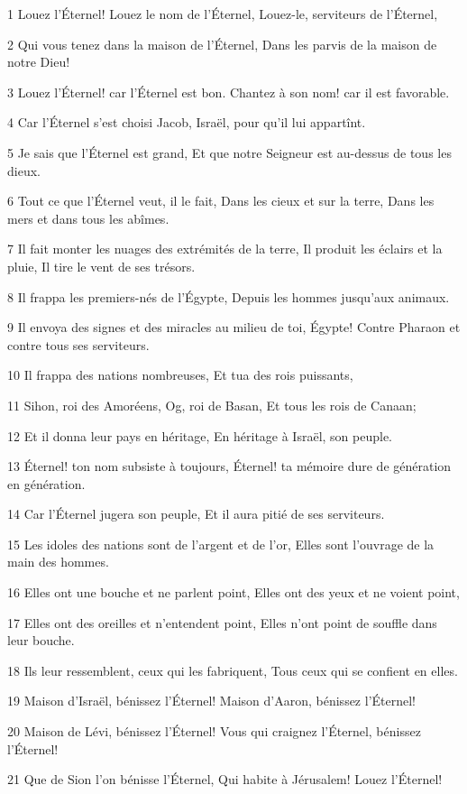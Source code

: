 \par 1 Louez l'Éternel! Louez le nom de l'Éternel, Louez-le, serviteurs de l'Éternel,
\par 2 Qui vous tenez dans la maison de l'Éternel, Dans les parvis de la maison de notre Dieu!
\par 3 Louez l'Éternel! car l'Éternel est bon. Chantez à son nom! car il est favorable.
\par 4 Car l'Éternel s'est choisi Jacob, Israël, pour qu'il lui appartînt.
\par 5 Je sais que l'Éternel est grand, Et que notre Seigneur est au-dessus de tous les dieux.
\par 6 Tout ce que l'Éternel veut, il le fait, Dans les cieux et sur la terre, Dans les mers et dans tous les abîmes.
\par 7 Il fait monter les nuages des extrémités de la terre, Il produit les éclairs et la pluie, Il tire le vent de ses trésors.
\par 8 Il frappa les premiers-nés de l'Égypte, Depuis les hommes jusqu'aux animaux.
\par 9 Il envoya des signes et des miracles au milieu de toi, Égypte! Contre Pharaon et contre tous ses serviteurs.
\par 10 Il frappa des nations nombreuses, Et tua des rois puissants,
\par 11 Sihon, roi des Amoréens, Og, roi de Basan, Et tous les rois de Canaan;
\par 12 Et il donna leur pays en héritage, En héritage à Israël, son peuple.
\par 13 Éternel! ton nom subsiste à toujours, Éternel! ta mémoire dure de génération en génération.
\par 14 Car l'Éternel jugera son peuple, Et il aura pitié de ses serviteurs.
\par 15 Les idoles des nations sont de l'argent et de l'or, Elles sont l'ouvrage de la main des hommes.
\par 16 Elles ont une bouche et ne parlent point, Elles ont des yeux et ne voient point,
\par 17 Elles ont des oreilles et n'entendent point, Elles n'ont point de souffle dans leur bouche.
\par 18 Ils leur ressemblent, ceux qui les fabriquent, Tous ceux qui se confient en elles.
\par 19 Maison d'Israël, bénissez l'Éternel! Maison d'Aaron, bénissez l'Éternel!
\par 20 Maison de Lévi, bénissez l'Éternel! Vous qui craignez l'Éternel, bénissez l'Éternel!
\par 21 Que de Sion l'on bénisse l'Éternel, Qui habite à Jérusalem! Louez l'Éternel!

